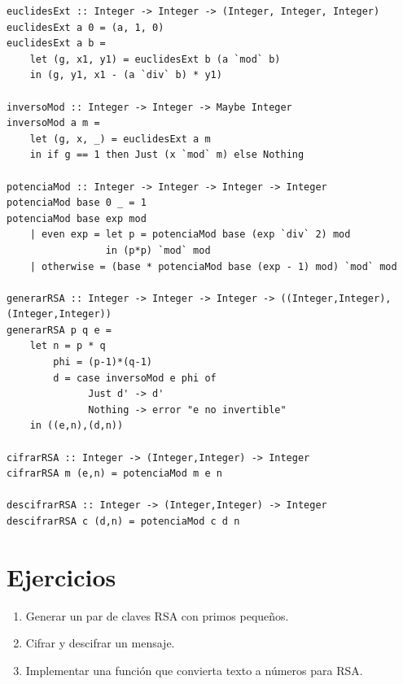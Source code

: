 \begin{lstlisting}[caption={RSA en Haskell}]
euclidesExt :: Integer -> Integer -> (Integer, Integer, Integer)
euclidesExt a 0 = (a, 1, 0)
euclidesExt a b =
    let (g, x1, y1) = euclidesExt b (a `mod` b)
    in (g, y1, x1 - (a `div` b) * y1)

inversoMod :: Integer -> Integer -> Maybe Integer
inversoMod a m =
    let (g, x, _) = euclidesExt a m
    in if g == 1 then Just (x `mod` m) else Nothing

potenciaMod :: Integer -> Integer -> Integer -> Integer
potenciaMod base 0 _ = 1
potenciaMod base exp mod
    | even exp = let p = potenciaMod base (exp `div` 2) mod
                 in (p*p) `mod` mod
    | otherwise = (base * potenciaMod base (exp - 1) mod) `mod` mod

generarRSA :: Integer -> Integer -> Integer -> ((Integer,Integer),(Integer,Integer))
generarRSA p q e =
    let n = p * q
        phi = (p-1)*(q-1)
        d = case inversoMod e phi of
              Just d' -> d'
              Nothing -> error "e no invertible"
    in ((e,n),(d,n))

cifrarRSA :: Integer -> (Integer,Integer) -> Integer
cifrarRSA m (e,n) = potenciaMod m e n

descifrarRSA :: Integer -> (Integer,Integer) -> Integer
descifrarRSA c (d,n) = potenciaMod c d n
\end{lstlisting}

\section{Ejercicios}
\begin{enumerate}
  \item Generar un par de claves RSA con primos pequeños.
  \item Cifrar y descifrar un mensaje.
  \item Implementar una función que convierta texto a números para RSA.
\end{enumerate}